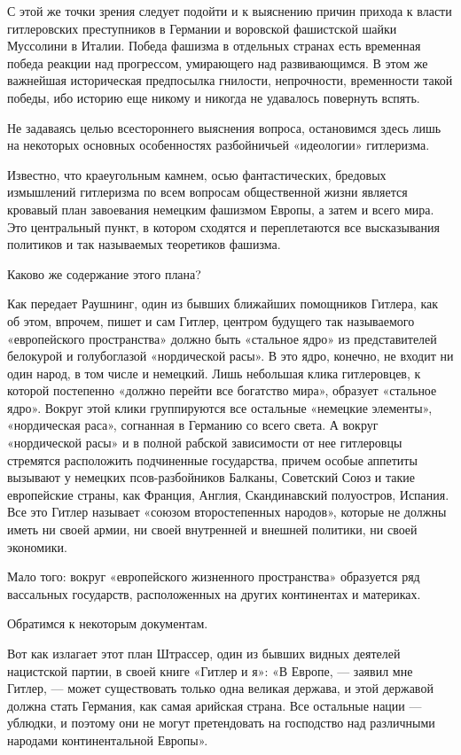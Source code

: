\documentclass[12pt, a4paper, openany]{book}
\begin{document}
С этой же точки зрения следует подойти и к выяснению причин прихода к власти гитлеровских преступников в Германии и воровской фашистской шайки Муссолини в Италии. Победа фашизма в отдельных странах есть временная победа реакции над прогрессом, умирающего над развивающимся. В этом же важнейшая историческая предпосылка гнилости, непрочности, временности такой победы, ибо историю еще никому и никогда не удавалось повернуть вспять.

Не задаваясь целью всестороннего выяснения вопроса, остановимся здесь лишь на некоторых основных особенностях разбойничьей «идеологии» гитлеризма.

Известно, что краеугольным камнем, осью фантастических, бредовых измышлений гитлеризма по всем вопросам общественной жизни является кровавый план завоевания немецким фашизмом Европы, а затем и всего мира. Это центральный пункт, в котором сходятся и переплетаются все высказывания политиков и так называемых теоретиков фашизма.

Каково же содержание этого плана?

Как передает Раушнинг, один из бывших ближайших помощников Гитлера, как об этом, впрочем, пишет и сам Гитлер, центром будущего так называемого «европейского пространства» должно быть «стальное ядро» из представителей белокурой и голубоглазой «нордической расы». В это ядро, конечно, не входит ни один народ, в том числе и немецкий. Лишь небольшая клика гитлеровцев, к которой постепенно «должно перейти все богатство мира», образует «стальное ядро». Вокруг этой клики группируются все остальные «немецкие элементы», «нордическая раса», согнанная в Германию со всего света. А вокруг «нордической расы» и в полной рабской зависимости от нее гитлеровцы стремятся расположить подчиненные государства, причем особые аппетиты вызывают у немецких псов-разбойников Балканы, Советский Союз и такие европейские страны, как Франция, Англия, Скандинавский полуостров, Испания. Все это Гитлер называет «союзом второстепенных народов», которые не должны иметь ни своей армии, ни своей внутренней и внешней политики, ни своей экономики.

Мало того: вокруг «европейского жизненного пространства» образуется ряд вассальных государств, расположенных на других континентах и материках.

Обратимся к некоторым документам.

Вот как излагает этот план Штрассер, один из бывших видных деятелей нацистской партии, в своей книге «Гитлер и я»: «В Европе, — заявил мне Гитлер, — может существовать только одна великая держава, и этой державой должна стать Германия, как самая арийская страна. Все остальные нации — ублюдки, и поэтому они не могут претендовать на господство над различными народами континентальной Европы».
\end{document}
